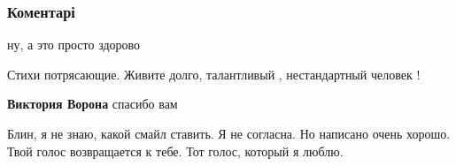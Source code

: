  
 
 
 
 
\subsubsection{Коментарі}

\begin{itemize}
 
ну, а это просто здорово

 
Стихи потрясающие. Живите долго, талантливый , нестандартный человек !
\begin{itemize}
 
\textbf{Виктория Ворона} спасибо вам
\end{itemize}

 

Блин, я не знаю, какой смайл ставить. Я не согласна. Но написано очень хорошо.
Твой голос возвращается к тебе. Тот голос, который я люблю.

\begin{itemize}
 

\end{itemize}
\end{itemize}
